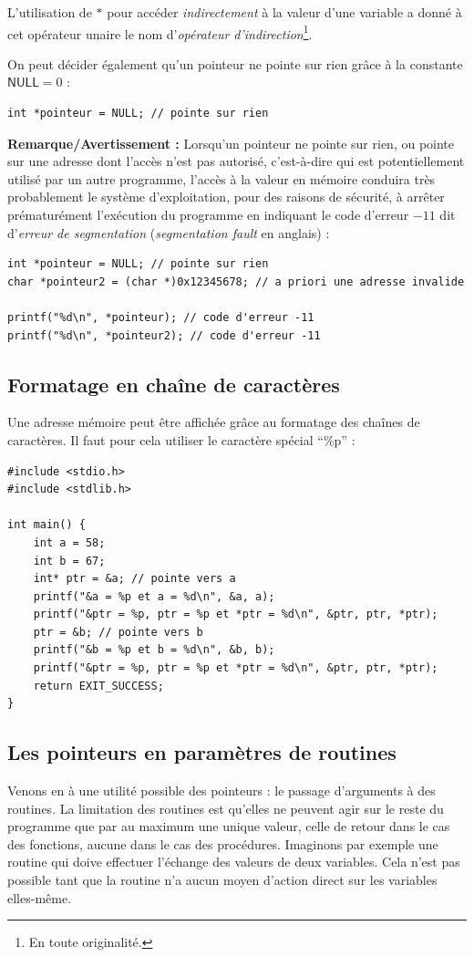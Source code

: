 \documentclass[../../../main.tex]{subfiles}
\begin{document}
L'utilisation de $\ast$ pour accéder \textit{indirectement} à la valeur d'une variable a donné à cet opérateur unaire le nom d'\textit{opérateur d'indirection}\footnote{En toute originalité.}.
 
On peut décider également qu'un pointeur ne pointe sur rien grâce à la constante $\textsf{NULL} = 0$ :
\begin{verbatim}
int *pointeur = NULL; // pointe sur rien
\end{verbatim}
\textbf{Remarque/Avertissement :} Lorsqu'un pointeur ne pointe sur rien, ou pointe sur une adresse dont l'accès n'est pas autorisé, c'est-à-dire qui est potentiellement utilisé par un autre programme, l'accès à la valeur en mémoire conduira très probablement le système d'exploitation, pour des raisons de sécurité, à arrêter prématurément l'exécution du programme en indiquant le code d'erreur $-11$ dit d'\textit{erreur de segmentation} (\textit{segmentation fault} en anglais) :
\begin{verbatim}
int *pointeur = NULL; // pointe sur rien
char *pointeur2 = (char *)0x12345678; // a priori une adresse invalide 

printf("%d\n", *pointeur); // code d'erreur -11
printf("%d\n", *pointeur2); // code d'erreur -11
\end{verbatim}
\subsection{Formatage en chaîne de caractères}
Une adresse mémoire peut être affichée grâce au formatage des chaînes de caractères. Il faut pour cela utiliser le caractère spécial ``\%p'' :
\begin{verbatim}
#include <stdio.h>
#include <stdlib.h>

int main() {
	int a = 58;
	int b = 67;
	int* ptr = &a; // pointe vers a
	printf("&a = %p et a = %d\n", &a, a);
	printf("&ptr = %p, ptr = %p et *ptr = %d\n", &ptr, ptr, *ptr);
	ptr = &b; // pointe vers b
	printf("&b = %p et b = %d\n", &b, b);
	printf("&ptr = %p, ptr = %p et *ptr = %d\n", &ptr, ptr, *ptr);
	return EXIT_SUCCESS;
}
\end{verbatim}
\subsection{Les pointeurs en paramètres de routines}
Venons en à une utilité possible des pointeurs : le passage d'arguments à des routines. La limitation des routines est qu'elles ne peuvent agir sur le reste du programme que par au maximum une unique valeur, celle de retour dans le cas des fonctions, aucune dans le cas des procédures. Imaginons par exemple une routine qui doive effectuer l'échange des valeurs de deux variables. Cela n'est pas possible tant que la routine n'a aucun moyen d'action direct sur les variables elles-même.
\end{document}
